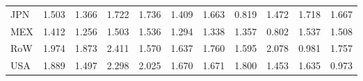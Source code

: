 \begin{table}[htbp]
\begin{tabular}{lcccccccccc}
  JPN & \textcolor[RGB]{153,99,102}{1.503} & \textcolor[RGB]{191,124,64}{1.366} & \textcolor[RGB]{69,45,186}{1.722} & \textcolor[RGB]{66,43,189}{1.736} & \textcolor[RGB]{184,119,71}{1.409} & \textcolor[RGB]{92,59,163}{1.663} & \textcolor[RGB]{245,158,10}{0.819} & \textcolor[RGB]{158,102,97}{1.472} & \textcolor[RGB]{74,48,181}{1.718} & \textcolor[RGB]{87,56,168}{1.667} \\ 
  MEX & \textcolor[RGB]{178,115,76}{1.412} & \textcolor[RGB]{219,142,36}{1.256} & \textcolor[RGB]{150,97,105}{1.503} & \textcolor[RGB]{140,91,115}{1.536} & \textcolor[RGB]{214,139,41}{1.294} & \textcolor[RGB]{204,132,51}{1.338} & \textcolor[RGB]{196,127,59}{1.357} & \textcolor[RGB]{250,162,5}{0.802} & \textcolor[RGB]{135,87,120}{1.537} & \textcolor[RGB]{148,96,107}{1.508} \\ 
  RoW & \textcolor[RGB]{23,15,232}{1.974} & \textcolor[RGB]{36,23,219}{1.873} & \textcolor[RGB]{3,2,252}{2.411} & \textcolor[RGB]{117,76,138}{1.570} & \textcolor[RGB]{97,63,158}{1.637} & \textcolor[RGB]{56,36,199}{1.760} & \textcolor[RGB]{105,68,150}{1.595} & \textcolor[RGB]{8,5,247}{2.078} & \textcolor[RGB]{232,150,23}{0.981} & \textcolor[RGB]{59,38,196}{1.757} \\ 
  USA & \textcolor[RGB]{33,21,222}{1.889} & \textcolor[RGB]{156,101,99}{1.497} & \textcolor[RGB]{5,3,250}{2.298} & \textcolor[RGB]{10,7,245}{2.025} & \textcolor[RGB]{84,54,171}{1.670} & \textcolor[RGB]{82,53,173}{1.671} & \textcolor[RGB]{51,33,204}{1.800} & \textcolor[RGB]{166,107,89}{1.453} & \textcolor[RGB]{99,64,156}{1.635} & \textcolor[RGB]{235,152,20}{0.973} \\ 
   \hline
\end{tabular}
\end{table}

